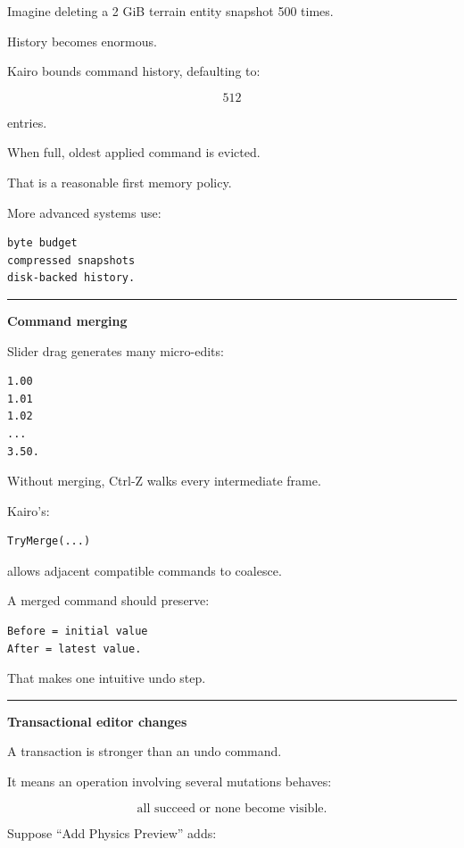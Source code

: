 Imagine deleting a 2 GiB terrain entity snapshot 500 times.

History becomes enormous.

Kairo bounds command history, defaulting to:

\[
512
\]

entries.

When full, oldest applied command is evicted.

That is a reasonable first memory policy.

More advanced systems use:

\begin{verbatim}
byte budget
compressed snapshots
disk-backed history.
\end{verbatim}

\begin{center}\rule{0.5\linewidth}{0.5pt}\end{center}

\textbf{Command merging}

Slider drag generates many micro-edits:

\begin{verbatim}
1.00
1.01
1.02
...
3.50.
\end{verbatim}

Without merging, Ctrl-Z walks every intermediate frame.

Kairo's:

\begin{verbatim}
TryMerge(...)
\end{verbatim}

allows adjacent compatible commands to coalesce.

A merged command should preserve:

\begin{verbatim}
Before = initial value
After = latest value.
\end{verbatim}

That makes one intuitive undo step.

\begin{center}\rule{0.5\linewidth}{0.5pt}\end{center}

\textbf{Transactional editor changes}

A transaction is stronger than an undo command.

It means an operation involving several mutations behaves:

\[
\boxed{
\text{all succeed or none become visible}.
}
\]

Suppose ``Add Physics Preview'' adds:

